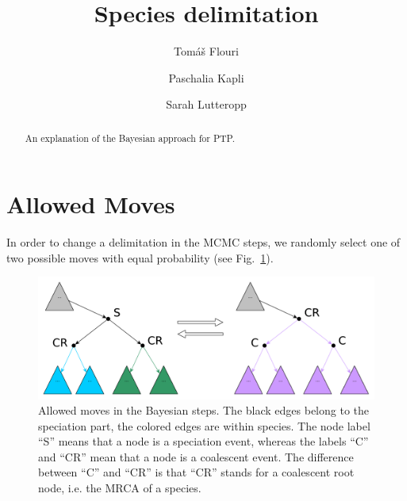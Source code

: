 \documentclass{llncs}
\begin{document}
\title{Species delimitation}


\author{Tom\'{a}\v{s} Flouri \and Paschalia Kapli \and Sarah Lutteropp}

\maketitle

\begin{abstract}
An explanation of the Bayesian approach for PTP.\@
\end{abstract}

\section{Allowed Moves}

In order to change a delimitation in the MCMC steps, we randomly select one of two possible moves with equal probability (see Fig.~\ref{fig:moves}).

\begin{figure}[h!]
\centering
\includegraphics[scale=0.4]{images/moves.pdf}
\caption{Allowed moves in the Bayesian steps. The black edges belong to the speciation part, the colored edges are within species. The node label ``S'' means that a node is a speciation event, whereas the labels ``C'' and ``CR'' mean that a node is a coalescent event. The difference between ``C'' and ``CR'' is that ``CR'' stands for a coalescent root node, i.e. the MRCA of a species.}
\label{fig:moves}
\end{figure}



\end{document}
